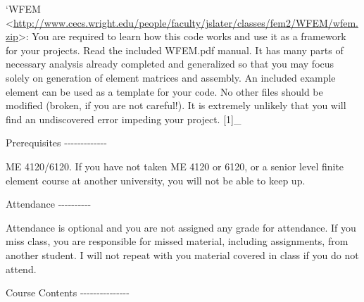 `WFEM
\textless{}\url{http://www.cecs.wright.edu/people/faculty/jslater/classes/fem2/WFEM/wfem.zip}\textgreater{}: You are required to learn how this code works and use it as a
framework for your projects. Read the included WFEM.pdf manual. It has many parts of necessary analysis
already completed and generalized so that you may focus solely on
generation of element matrices and assembly. An included example element can be used as a template for your code. No other files
should be modified (broken, if you are not careful!). It is extremely unlikely that you will find
an undiscovered error impeding your project. {[}1{]}\_

Prerequisites
-\/-\/-\/-\/-\/-\/-\/-\/-\/-\/-\/-\/-

ME 4120/6120. If you have not taken ME 4120 or 6120, or a senior level
finite element course at another university, you will not be able to
keep up. 

Attendance
-\/-\/-\/-\/-\/-\/-\/-\/-\/-

Attendance is optional and you are not assigned any grade for
attendance. If you miss class, you are responsible for missed material,
including assignments, from another student. I will not repeat with you
material covered in class if you do not attend.

Course Contents
-\/-\/-\/-\/-\/-\/-\/-\/-\/-\/-\/-\/-\/-\/-

